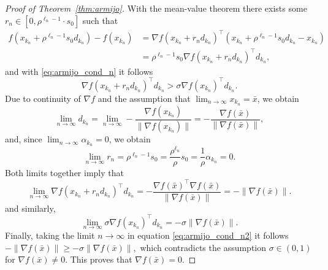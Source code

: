 \documentclass[12pt,openany]{book}
\theoremstyle{definition}
\theoremstyle{definition}
\begin{document}
\begin{proof}[Proof of Theorem~\ref{thm:armijo}]
With the mean-value theorem there exists some $r_n\in[0,\rho^{\ell_n-1}\cdot s_0]$ such that
\begin{align*}
f(x_{k_n} + \rho^{\ell_n-1} s_0 d_{k_n} ) - f(x_{k_n}) &= \nabla f(x_{k_n} + r_n d_{k_n})^\top (x_{k_n} + \rho^{\ell_n-1} s_0 d_{k_n} - x_{k_n})\\
&=\rho^{\ell_n-1} s_0  \nabla f(x_{k_n} + r_n d_{k_n})^\top d_{k_n},
\end{align*}
and with \eqref{eq:armijo_cond_n} it follows
\begin{equation} \label{eq:armijo_cond_n2}
\nabla f(x_{k_n} + r_n d_{k_n})^\top d_{k_n} > \sigma \nabla f(x_{k_n})^\top d_{k_n}.
\end{equation}
Due to continuity of $\nabla f$ and the assumption that $\lim_{n\to\infty} x_{k_n} = \bar x$, we obtain
\[\lim_{n\to\infty} d_{k_n} =\lim_{n\to\infty} - \frac{\nabla f(x_{k_n})}{\|\nabla f(x_{k_n})\|} = -\frac{\nabla f(\bar x)}{\|\nabla f(\bar x)\|}, \]
and, since $\lim_{n\to\infty}\alpha_{k_n} = 0$, we obtain
\[\lim_{n\to\infty} r_n = \rho^{\ell_n-1}s_0 = \frac{\rho^{\ell_n}}{\rho} s_0 = \frac{1}{\rho}\alpha_{k_n} = 0. \]
Both limits together imply that
\[\lim_{n\to\infty} \nabla f(x_{k_n} + r_n d_{k_n})^\top d_{k_n} = -\frac{\nabla f(\bar x)^\top \nabla f(\bar x)}{\|\nabla f(\bar x)\|} = -\|\nabla f(\bar x)\|. \]
and similarly, 
\[\lim_{n\to\infty} \sigma\nabla f(x_{k_n})^\top d_{k_n} = -\sigma \|\nabla f(\bar x)\|. \]
Finally, taking the limit $n\to\infty$ in equation \eqref{eq:armijo_cond_n2} it follows
\( -\|\nabla f(\bar x)\| \ge -\sigma \|\nabla f(\bar x)\|,\)
which contradicts the assumption $\sigma\in(0,1)$ for $\nabla f(\bar x) \neq 0$.  This proves that $\nabla f(\bar x) = 0$. 
\end{proof}
\end{document}
